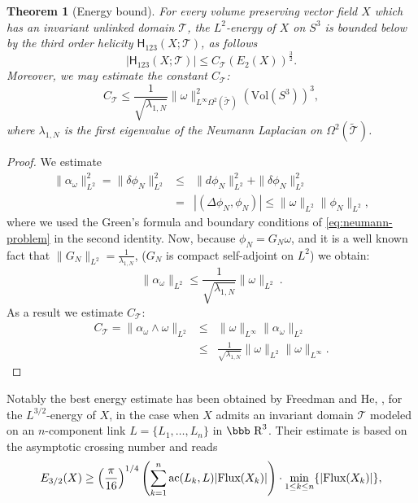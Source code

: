 \documentclass[12pt]{article}
\newtheorem{theorem}{Theorem}[section]
\newcommand{\R}{\mbox{\bbb R}}       %
\begin{document}
\begin{theorem}[Energy bound]
 For every volume preserving vector field $X$ which has an invariant unlinked domain $\mathcal{T}$,
 the $L^2$-energy of $X$ on $S^3$ is bounded below by the third order helicity $\mathsf{H}_{123}(X;\mathcal{T})$, as follows
 \begin{equation}
  |\mathsf{H}_{123}(X;\mathcal{T})|\leq C_\mathcal{T} (E_2(X))^\frac{3}{2}.
 \end{equation}
Moreover, we may estimate the constant $C_\mathcal{T}$:
 \begin{equation}\label{eq:C_T-estimate}
  C_\mathcal{T}\leq \frac{1}{\sqrt{\lambda_{1,N}}}\|\omega\|^2_{L^\infty\Omega^2(\widetilde{\mathcal{T}})}(\text{Vol}(S^3))^3,
 \end{equation}
where $\lambda_{1,N}$ is the first eigenvalue of the Neumann  Laplacian on  $\Omega^2(\widetilde{\mathcal{T}})$.
\end{theorem}
\begin{proof}
We estimate
\begin{eqnarray*}
 \|\alpha_\omega\|^2_{L^2} = \|\delta \phi_N\|^2_{L^2} & \leq & \|d\phi_N\|^2_{L^2}+\|\delta\phi_N\|^2_{L^2}\\
 & = & |(\Delta \phi_N,\phi_N)| \leq  \|\omega\|_{L^2}\|\phi_N\|_{L^2},
\end{eqnarray*}
where we used the Green's formula \cite[p. 60]{Schwarz95} and boundary conditions of \eqref{eq:neumann-problem} in the second identity. Now, because $\phi_N=G_N\omega$, and 
it is a well known fact that $\|G_N\|_{L^2}=\frac{1}{\lambda_{1,N}}$, ($G_N$ is compact self-adjoint on $L^2$) we obtain:
\[
\|\alpha_\omega\|_{L^2}\leq \frac{1}{\sqrt{\lambda_{1, N}}} \|\omega\|_{L^2}\ .
\]
As a result we estimate $C_\mathcal{T}$:
\begin{eqnarray*}
 C_\mathcal{T}=\|\alpha_\omega\wedge\omega\|_{L^2} & \leq & \|\omega\|_{L^\infty}\|\alpha_\omega\|_{L^2}\\
 & \leq &  \frac{1}{\sqrt{\lambda_{1, N}}} \|\omega\|_{L^2}\|\omega\|_{L^\infty}.
\end{eqnarray*}
\end{proof}
Notably the best energy estimate has been obtained by Freedman and He, \cite{Freedman91-2}, for the $L^{3/2}$-energy of $X$,  in the case when $X$ admits an invariant domain $\mathcal{T}$ modeled on an $n$-component link $L=\{L_1,\ldots,L_n\}$ in $\R^3$. Their estimate
is based on the asymptotic crossing number and reads
\begin{equation}\label{eq:energy-free-he}
 E_{3/2}(X)\geq \Bigl(\frac{\pi}{16}\Bigr)^{1/4}\left(\sum^n_{k=1} \text{ac}(L_k,L)|\text{Flux}(X_k)|\right)\cdot \min_{1\leq k\leq n}\{|\text{Flux}(X_k)|\},
\end{equation}
\end{document}
